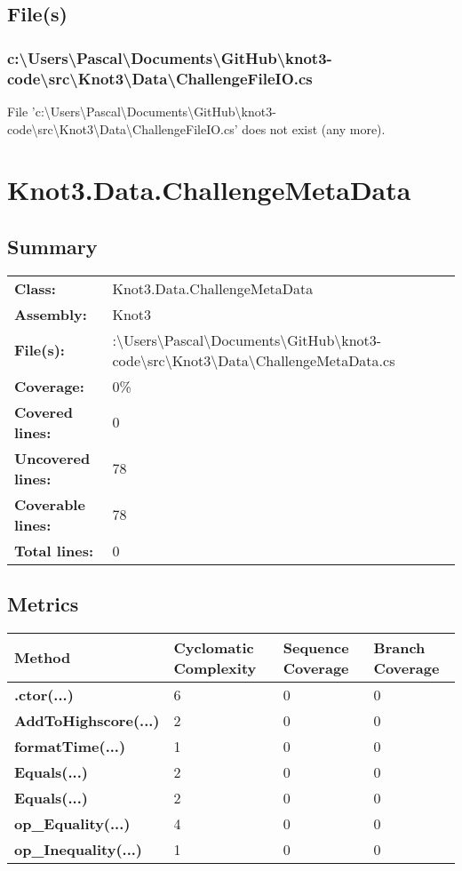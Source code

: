 \documentclass[a4paper,10pt]{article}
\begin{document}
\subsection{File(s)}
\subsubsection{c:\textbackslash Users\textbackslash Pascal\textbackslash Documents\textbackslash GitHub\textbackslash knot3-code\textbackslash src\textbackslash Knot3\textbackslash Data\textbackslash ChallengeFileIO.cs}
 File 'c:\textbackslash Users\textbackslash Pascal\textbackslash Documents\textbackslash GitHub\textbackslash knot3-code\textbackslash src\textbackslash Knot3\textbackslash Data\textbackslash ChallengeFileIO.cs' does not exist (any more).
\newpage
\section{Knot3.Data.ChallengeMetaData}
\subsection{Summary}
\begin{longtable}[l]{ll}
\textbf{Class:} & Knot3.Data.ChallengeMetaData\\
\textbf{Assembly:} & Knot3\\
\textbf{File(s):} & \begin{minipage}[t]{12cm}{:\textbackslash Users\textbackslash Pascal\textbackslash Documents\textbackslash GitHub\textbackslash knot3-code\textbackslash src\textbackslash Knot3\textbackslash Data\textbackslash ChallengeMetaData.cs}\end{minipage} \\
\textbf{Coverage:} & 0\%\\
\textbf{Covered lines:} & 0\\
\textbf{Uncovered lines:} & 78\\
\textbf{Coverable lines:} & 78\\
\textbf{Total lines:} & 0\\
\end{longtable}
\subsection{Metrics}
\begin{longtable}[l]{|l|l|l|l|}
\hline
\textbf{Method} & \textbf{Cyclomatic Complexity} & \textbf{Sequence Coverage} & \textbf{Branch Coverage}\\
\hline
\textbf{.ctor(...)} & 6 & 0 & 0\\
\hline
\textbf{AddToHighscore(...)} & 2 & 0 & 0\\
\hline
\textbf{formatTime(...)} & 1 & 0 & 0\\
\hline
\textbf{Equals(...)} & 2 & 0 & 0\\
\hline
\textbf{Equals(...)} & 2 & 0 & 0\\
\hline
\textbf{op\_Equality(...)} & 4 & 0 & 0\\
\hline
\textbf{op\_Inequality(...)} & 1 & 0 & 0\\
\hline
\end{longtable}
\end{document}

